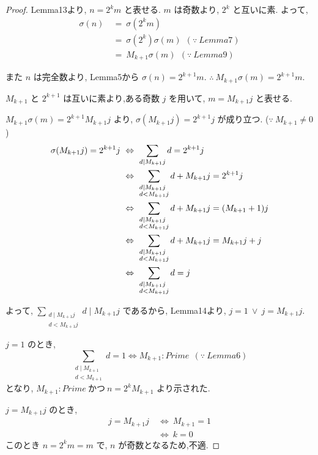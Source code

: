\begin{proof}
Lemma13より, \(n = 2^km\) と表せる. \(m\) は奇数より, \(2^k\) と互いに素.
よって,
\begin{align*}
\sigma(n) ~&=~ \sigma(2^km)\\
          ~&=~ \sigma(2^k)\sigma(m)~~(\because~Lemma7)\\
          ~&=~ M_{k+1}\sigma(m)~~(\because~Lemma9)
\end{align*}

また \(n\) は完全数より, Lemma5から \(\sigma(n) = 2^{k+1}m\). \(\therefore~ M_{k+1}\sigma(m) = 2^{k+1}m\).

\(M_{k+1}\) と \(2^{k+1}\) は互いに素より,ある奇数 \(j\) を用いて, \(m = M_{k+1}j\) と表せる.

\(M_{k+1} \sigma(m) = 2^{k+1} M_{k+1}j\) より, \(\sigma(M_{k+1}j) = 2^{k+1}j\) が成り立つ. (\(\because~M_{k+1} \neq 0\))
\begin{align*}
\sigma(M_{k+1}j) = 2^{k+1}j ~&\Leftrightarrow~ \sum_{d \mid M_{k+1}j} d = 2^{k+1}j\\
                            ~&\Leftrightarrow~ \sum_{\begin{subarray}{l} d \mid M_{k+1}j\\ d < M_{k+1}j \end{subarray}} d + M_{k+1}j = 2^{k+1}j\\
                            ~&\Leftrightarrow~ \sum_{\begin{subarray}{l} d \mid M_{k+1}j\\ d < M_{k+1}j \end{subarray}} d + M_{k+1}j = (M_{k+1}+1)j\\
                            ~&\Leftrightarrow~ \sum_{\begin{subarray}{l} d \mid M_{k+1}j\\ d < M_{k+1}j \end{subarray}} d + M_{k+1}j = M_{k+1}j + j\\
                            ~&\Leftrightarrow~ \sum_{\begin{subarray}{l} d \mid M_{k+1}j\\ d < M_{k+1}j \end{subarray}} d = j
\end{align*}

よって, \(\sum_{\substack{d \mid M_{k+1}j\\ d < M_{k+1}j}} d \mid M_{k+1}j\) であるから, Lemma14より, \(j = 1 ~\vee~ j = M_{k+1}j\).

\(j = 1\) のとき,
\[
\sum_{\substack{d \mid M_{k+1}\\ d < M_{k+1}}} d = 1 \Leftrightarrow M_{k+1} : Prime~~(\because~Lemma6)
\]
となり, \(M_{k+1} : Prime ~\text{かつ} ~n = 2^kM_{k+1}\) より示された.

\(j = M_{k+1}j\) のとき,
\begin{align*}
j = M_{k+1}j ~&\Leftrightarrow~ M_{k+1} = 1\\
             ~&\Leftrightarrow~ k = 0
\end{align*}
このとき \(n = 2^km = m\) で, \(n\) が奇数となるため,不適.
\end{proof}


